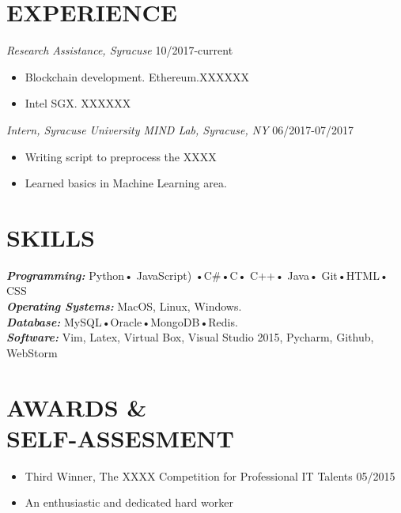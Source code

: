 \documentclass[margin]{res}
\begin{document}
\begin{resume}
\section{EXPERIENCE} 
                 {\sl Research Assistance, Syracuse} \hfill 10/2017-current \\
                  \begin{itemize}  \itemsep -2pt %
                 \item Blockchain development. Ethereum.XXXXXX
                 \item Intel SGX. XXXXXX
                 \end{itemize}

		 {\sl Intern, Syracuse University MIND Lab, Syracuse, NY} \hfill 06/2017-07/2017 \\
		 \begin{itemize}  \itemsep -2pt %
                 \item Writing script to preprocess the XXXX       
                 \item Learned basics in Machine Learning area.
                \end{itemize}

\section{SKILLS}
		{\sl\bf Programming:} Python• JavaScript) •C\#•C• C++• Java• Git•HTML• CSS \\
                {\sl\bf Operating Systems:} MacOS,  Linux, Windows.\\
                {\sl\bf Database:} MySQL•Oracle•MongoDB•Redis.\\
                {\sl\bf Software:} Vim, Latex, Virtual Box, Visual Studio 2015, Pycharm, Github, WebStorm\\
                
 
\section{AWARDS \& \\ SELF-ASSESMENT}  
		 \begin{itemize}  \itemsep -2pt %
                 \item Third Winner, The XXXX Competition for Professional IT Talents  \hfill 05/2015
                \item An enthusiastic and dedicated hard worker
                \end{itemize} 
\end{resume}
\end{document}
